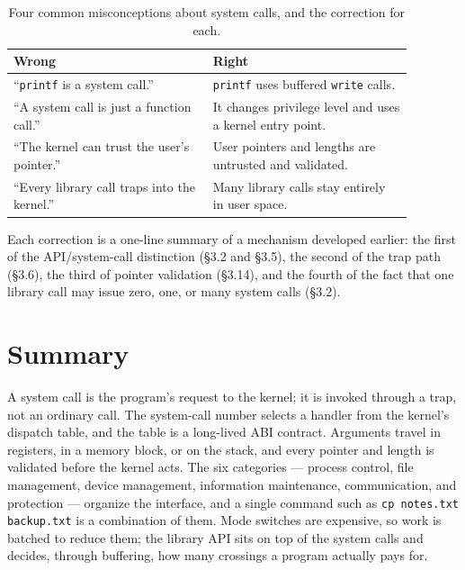 \documentclass[11pt]{article}
\begin{document}
\begin{table}[h]
\centering
\small
\renewcommand{\arraystretch}{1.25}
\begin{tabular}{@{}>{\raggedright\arraybackslash}p{0.44\linewidth}>{\raggedright\arraybackslash}p{0.44\linewidth}@{}}
\toprule
\textbf{Wrong} & \textbf{Right} \\
\midrule
``\texttt{printf} is a system call.'' &
\texttt{printf} uses buffered \texttt{write} calls. \\
``A system call is just a function call.'' &
It changes privilege level and uses a kernel entry point. \\
``The kernel can trust the user's pointer.'' &
User pointers and lengths are untrusted and validated. \\
``Every library call traps into the kernel.'' &
Many library calls stay entirely in user space. \\
\bottomrule
\end{tabular}
\caption{Four common misconceptions about system calls, and the correction for
each.}
\label{tab:misconceptions}
\end{table}

Each correction is a one-line summary of a mechanism developed earlier:
the first of the API/system-call distinction (\S3.2 and \S3.5), the second of
the trap path (\S3.6), the third of pointer validation (\S3.14), and the fourth
of the fact that one library call may issue zero, one, or many system calls
(\S3.2).

\section{Summary}

A system call is the program's request to the kernel; it is invoked through a
trap, not an ordinary call. The system-call number selects a handler from the
kernel's dispatch table, and the table is a long-lived ABI contract. Arguments
travel in registers, in a memory block, or on the stack, and every pointer and
length is validated before the kernel acts. The six categories --- process
control, file management, device management, information maintenance,
communication, and protection --- organize the interface, and a single command
such as \texttt{cp notes.txt backup.txt} is a combination of them. Mode
switches are expensive, so work is batched to reduce them; the library API sits
on top of the system calls and decides, through buffering, how many crossings a
program actually pays for.
\end{document}

